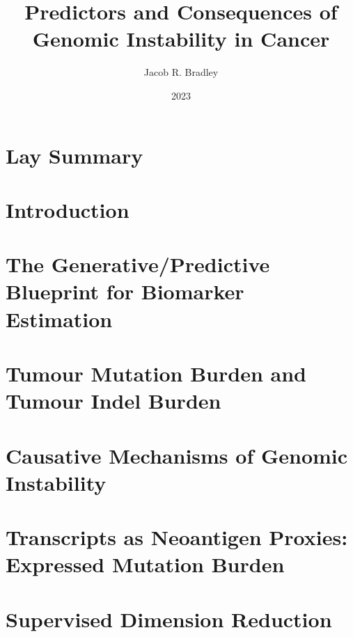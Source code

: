 \documentclass[10pt,twoside,openright]{report}
\title{Predictors and Consequences of Genomic Instability in Cancer}
\author{Jacob R. Bradley}
\date{2023}
\newcommand{\dobib}{
}
\begin{document}
\renewcommand{\dobib}{} %

\maketitle

\declaration

\dedication{To Morton...}



\chapter*{Lay Summary}
\label{chap:laysummary}



\printglossary[type=\acronymtype]

\tableofcontents

\chapter{Introduction \label{chap:intro}}




\chapter{The Generative/Predictive Blueprint for Biomarker Estimation \label{chap:genmodels}}



\chapter{Tumour Mutation Burden and Tumour Indel Burden}



\chapter{Causative Mechanisms of Genomic Instability}



\chapter{Transcripts as Neoantigen Proxies: Expressed Mutation Burden}






\appendix

\chapter{Supervised Dimension Reduction}

\end{document}
